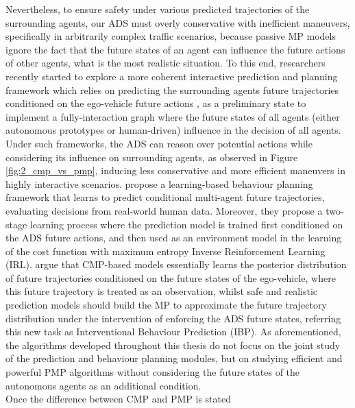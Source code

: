 Nevertheless, to ensure safety under various predicted trajectories of the surrounding agents, our \ac{ADS} must overly conservative with inefficient maneuvers, specifically in arbitrarily complex traffic scenarios, because passive \ac{MP} models ignore the fact that the future states of an agent can influence the future actions of other agents, what is the most realistic situation. To this end, researchers recently started to explore a more coherent interactive prediction and planning framework which relies on predicting the surrounding agents future trajectories conditioned on the ego-vehicle future actions \cite{tang2019multiple} \cite{rhinehart2019precog} \cite{khandelwal2020if}, as a preliminary state to implement a fully-interaction graph where the future states of all agents (either autonomous prototypes or human-driven) influence in the decision of all agents. Under such frameworks, the \acs{ADS} can reason over potential actions while considering its influence on surrounding agents, as observed in Figure \ref{fig:2_cmp_vs_pmp}, inducing less conservative and more efficient maneuvers in highly interactive scenarios. \cite{huang2023conditional} propose a learning-based behaviour planning framework that learns to predict conditional multi-agent future trajectories, evaluating decisions from real-world human data. Moreover, they propose a two-stage learning process where the prediction model is trained first conditioned on the \ac{ADS} future actions, and then used as an environment model in the learning of the cost function with maximum entropy Inverse Reinforcement Learning (IRL). \cite{tang2022interventional} argue that CMP-based models essentially learns the posterior distribution of future trajectories conditioned on the future states of the ego-vehicle, where this future trajectory is treated as an observation, whilst safe and realistic prediction models should build the \ac{MP} to approximate the future trajectory distribution under the intervention of enforcing the \ac{ADS} future states, referring this new task as Interventional Behaviour Prediction (IBP). As aforementioned, the algorithms developed throughout this thesis do not focus on the joint study of the prediction and behaviour planning modules, but on studying efficient and powerful PMP algorithms without considering the future states of the autonomous agents as an additional condition. \\

Once the difference between CMP and PMP is stated












